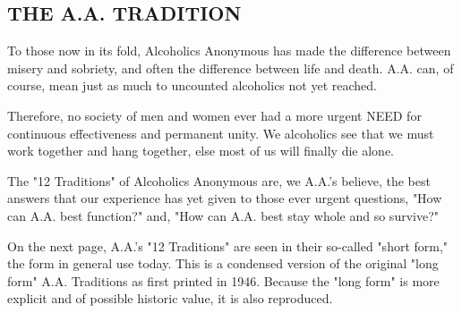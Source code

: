

\subsection*{THE A.A. TRADITION}

\begin{biblechapter}
    To those now in its fold, 
    Alcoholics Anonymous has made the difference 
    between misery and sobriety, 
    and often the difference between life and death. 
\verse A.A. can, of course, 
    mean just as much to uncounted alcoholics not yet reached.
  
\verse Therefore, no society of men and women 
    ever had a more urgent NEED for continuous effectiveness 
    and permanent unity.
\verse We alcoholics see that we must work together and hang together, 
    else most of us will finally die alone.

\verse The "12 Traditions" of Alcoholics Anonymous are, 
    we A.A.'s believe, 
    the best answers that our experience has yet given 
    to those ever urgent questions, 
    "How can A.A. best function?" 
    and, "How can A.A. best stay whole 
    and so survive?"
  
\verse On the next page, 
    A.A.'s "12 Traditions" are seen in their so-called "short form," 
    the form in general use today.
\verse This is a condensed version of the original 
    "long form" A.A. Traditions as first printed in 1946.
\verse Because the "long form" is more explicit 
    and of possible historic value, it is also reproduced.
\end{biblechapter}

